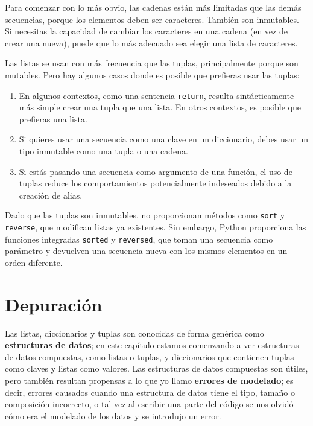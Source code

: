 
Para comenzar con lo más obvio, las cadenas están más limitadas que las demás
secuencias, porque los elementos deben ser caracteres. También son
inmutables. Si necesitas la capacidad de cambiar los caracteres
en una cadena (en vez de crear una nueva), puede que
lo más adecuado sea elegir una lista de caracteres.

Las listas se usan con más frecuencia que las tuplas, principalmente porque son mutables.
Pero hay algunos casos donde es posible que prefieras usar las tuplas:

\begin{enumerate}

\item En algunos contextos, como una sentencia {\tt return}, resulta
sintácticamente más simple crear una tupla que una lista. En otros
contextos, es posible que prefieras una lista.

\item Si quieres usar una secuencia como una clave en un diccionario,
debes usar un tipo inmutable como una tupla o una cadena.

\item Si estás pasando una secuencia como argumento de una función,
el uso de tuplas reduce los comportamientos potencialmente indeseados
debido a la creación de alias.

\end{enumerate}

Dado que las tuplas son inmutables, no proporcionan métodos
como {\tt sort} y {\tt reverse}, que modifican listas ya existentes.
Sin embargo, Python proporciona las funciones integradas {\tt sorted}
y {\tt reversed}, que toman una secuencia como parámetro
y devuelven una secuencia nueva con los mismos elementos en un
orden diferente.



\section{Depuración}


Las listas, diccionarios y tuplas son conocidas de forma genérica como
{\bf estructuras de datos}; en este capítulo estamos comenzando a ver
estructuras de datos compuestas, como listas o tuplas, y diccionarios que contienen tuplas
como claves y listas como valores. Las estructuras de datos compuestas son útiles, pero
también resultan propensas a lo que yo llamo {\bf errores de modelado}; es decir, errores
causados cuando una estructura de datos tiene el tipo, tamaño o composición incorrecto,
o tal vez al escribir una parte del código se nos olvidó cómo era el modelado
de los datos y se introdujo un error.

